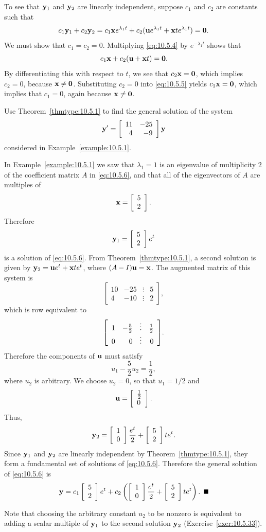 To see that ${\bf y}_{1}$ and ${\bf y}_{2}$ are linearly independent, suppose $c_{1}$ and $c_{2}$
are constants such that
\begin{equation}
  \label{eq:10.5.4}c_{1}{\bf y}_{1}+c_{2}{\bf y}_{2}=c_{1}{\bf x}e^{\lambda_{1}t}+c_{2}({\bf u}e^{\lambda_{1}t}+{\bf x}te^{\lambda_{1}t})={\bf0}.
\end{equation}
We must show that $c_{1}=c_{2}=0$. Multiplying \eqref{eq:10.5.4} by $e^{-\lambda_{1}t}$ shows that
\begin{equation}
  \label{eq:10.5.5}c_{1}{\bf x}+c_{2}({\bf u}+{\bf x}t)={\bf0}.
\end{equation}
By differentiating this with respect to $t$, we see that $c_{2}{\bf x}={\bf0}$, which implies
$c_{2}=0$, because ${\bf x}\ne{\bf0}$. Substituting $c_{2}=0$ into \eqref{eq:10.5.5} yields
$c_{1}{\bf x}={\bf0}$, which implies that $c_{1}=0$, again because ${\bf x}\ne{\bf0}$.
\begin{example}
  \label{example:10.5.2}\rm Use Theorem~\ref{thmtype:10.5.1} to find the general solution of the
  system
  \begin{equation}
    \label{eq:10.5.6}{\bf y}'=\left[\begin{array}{rr} 11&-25\\4&-9\end{array}\right]{\bf y}
  \end{equation}
  considered in Example~\ref{example:10.5.1}.
\end{example}

\begin{examplesolution}
\solution In Example~\ref{example:10.5.1} we saw that $\lambda_{1}=1$ is an eigenvalue of
multiplicity $2$ of the coefficient matrix $A$ in \eqref{eq:10.5.6}, and that all of the
eigenvectors of $A$ are multiples of
\[
  {\bf x}=\left[\begin{array}{l}5\\2\end{array}\right].
\]
Therefore
\[
  {\bf y}_{1}=\left[\begin{array}{l}5\\2\end{array}\right]e^{t}
\]
is a solution of \eqref{eq:10.5.6}. From Theorem~\ref{thmtype:10.5.1}, a second solution is given by
${\bf y}_{2}={\bf u}e^{t}+{\bf x}te^{t}$, where $(A-I){\bf u}={\bf x}$. The augmented matrix of this
system is
\[
  \left[
  \begin{array}{rrcr}
    10 & -25 & \vdots & 5 \\
    4  & -10 & \vdots & 2
  \end{array}\right],
\]
which is row equivalent to
\[
  \displaystyle{\left[\begin{array}{rrcr}1&-\frac{5}{2}&\vdots&1\over2\\ 0&0&\vdots&0\end{array}\right]}.
\]
Therefore the components of ${\bf u}$ must satisfy
\[
  u_{1}-\frac{5}{2}u_{2}=\frac{1}{2},
\]
where $u_{2}$ is arbitrary. We choose $u_{2}=0$, so that $u_{1}=1/2$ and
\[
  {\bf u}=\left[\begin{array}{l}\frac{1}{2}\\0\end{array}\right].
\]
Thus,
\[
  {\bf y}_{2}=\left[\begin{array}{l}1\\0\end{array}\right]{\frac{e^{t}}{2}}+\left[\begin{array}{l}5\\2\end{array}\right]te^{t}.
\]
Since ${\bf y}_{1}$ and ${\bf y}_{2}$ are linearly independent by Theorem~\ref{thmtype:10.5.1}, they
form a fundamental set of solutions of \eqref{eq:10.5.6}. Therefore the general solution of
\eqref{eq:10.5.6} is
\[
  {\bf y}=c_{1}\twocol52e^{t}+c_{2}\left(\twocol10{\frac{e^{t}}{2}}+\twocol52te^{t}\right).\bbox
\]

Note that choosing the arbitrary constant $u_{2}$ to be nonzero is equivalent to adding a scalar
multiple of ${\bf y}_{1}$ to the second solution ${\bf y}_{2}$ (Exercise~\ref{exer:10.5.33}).
\end{examplesolution}

